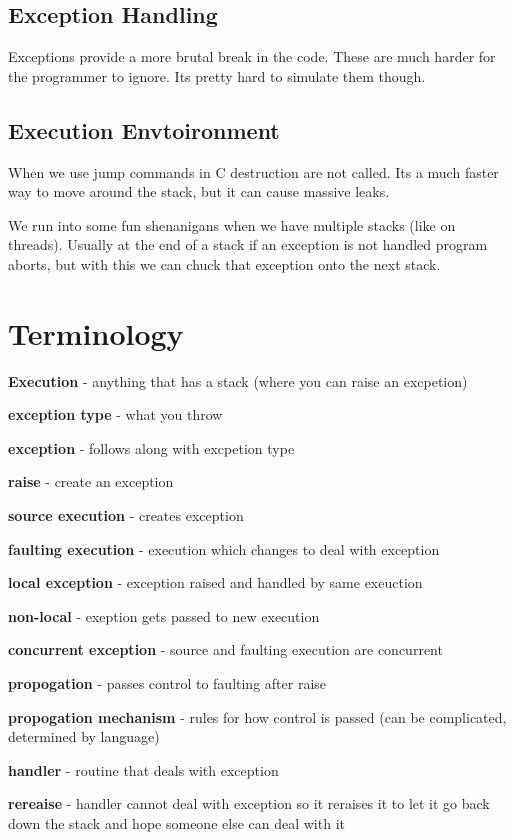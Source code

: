 \documentclass{article}
\begin{document}
\subsection{Exception Handling}
Exceptions provide a more brutal break in the code. These are much harder for the programmer to ignore. Its pretty hard to simulate them though.

\subsection{Execution Envtoironment}
When we use jump commands in C destruction are not called. Its a much faster way to move around the stack, but it can cause massive leaks.

We run into some fun shenanigans when we have multiple stacks (like on threads). Usually at the end of a stack if an exception is not handled program aborts, but with this we can chuck that exception onto the next stack.

\section{Terminology}
\textbf{Execution} - anything that has a stack (where you can raise an excpetion)

\textbf{exception type} - what you throw

\textbf{exception} - follows along with excpetion type

\textbf{raise} - create an exception

\textbf{source execution} - creates exception

\textbf{faulting execution} - execution which changes to deal with exception

\textbf{local exception} - exception raised and handled by same exeuction

\textbf{non-local} - exeption gets passed to new execution

\textbf{concurrent exception} - source and faulting execution are concurrent

\textbf{propogation} - passes control to faulting after raise

\textbf{propogation mechanism} - rules for how control is passed (can be complicated, determined by language)

\textbf{handler} - routine that deals with exception

\textbf{rereaise} - handler cannot deal with exception so it reraises it to let it go back down the stack and hope someone else can deal with it
\end{document}
